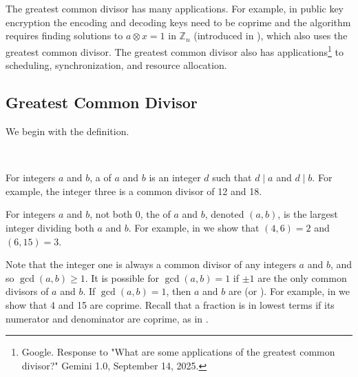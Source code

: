 \section{\secgcd}
\label{sec_gcd}

The greatest common divisor has many applications.  For example, in public key encryption the encoding and decoding keys need to be coprime and the algorithm requires finding solutions to $a \otimes x = 1$ in $\mathbb{Z}_n$ (introduced in ), which also uses the greatest common divisor.  The greatest common divisor also has applications\footnote{Google. Response to "What are some applications of the greatest common divisor?" Gemini 1.0, September 14, 2025.} to scheduling, synchronization, and resource allocation. 

\newcommand{\subgcd}{Greatest Common Divisor}
\subsection{\subgcd}
\label{sub_gcd}

We begin with the definition.

\begin{defn}
\label{defn_gcd}
~
    \begin{apart}
        \item For integers $a$ and $b$, a  of $a$ and $b$ is an integer $d$ such that $d \mid a$ and $d \mid b$.  For example, the integer three is a common divisor of 12 and 18.
        \item For integers $a$ and $b$, not both 0, the  of $a$ and $b$, denoted $(a,b)$, is the largest integer dividing both $a$ and $b$.  For example, in  we show that $(4,6)= 2$ and $(6,15)=3$.  

        \item Note that the integer one is always a common divisor of any integers $a$ and $b$, and so $\gcd(a,b)\ge 1$.  It is possible for $\gcd(a,b)=1$ if $\pm 1$ are the only common divisors of $a$ and $b$. If $\gcd(a,b)=1$, then $a$ and $b$ are  (or ). For example, in  we show that 4 and 15 are coprime.  Recall that a fraction is in lowest terms if its numerator and denominator are coprime, as in .
    \end{apart}
\end{defn}

